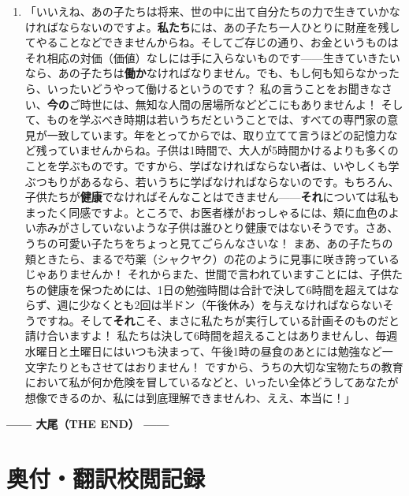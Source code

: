 \documentclass[a4paper,11pt,openany]{ltjsbook}
\begin{document}
\begin{enumerate}[label=\textbf{\arabic*.}, start=101]
\item 「いいえね、あの子たちは将来、世の中に出て自分たちの力で生きていかなければならないのですよ。\textbf{私たち}には、あの子たち一人ひとりに財産を残してやることなどできませんからね。そしてご存じの通り、お金というものはそれ相応の対価（価値）なしには手に入らないものです——生きていきたいなら、あの子たちは\textbf{働か}なければなりません。でも、もし何も知らなかったら、いったいどうやって働けるというのです？ 私の言うことをお聞きなさい、\textbf{今の}ご時世には、無知な人間の居場所などどこにもありませんよ！ そして、ものを学ぶべき時期は若いうちだということでは、すべての専門家の意見が一致しています。年をとってからでは、取り立てて言うほどの記憶力など残っていませんからね。子供は1時間で、大人が5時間かけるよりも多くのことを学ぶものです。ですから、学ばなければならない者は、いやしくも学ぶつもりがあるなら、若いうちに学ばなければならないのです。もちろん、子供たちが\textbf{健康}でなければそんなことはできません——\textbf{それ}については私もまったく同感ですよ。ところで、お医者様がおっしゃるには、頬に血色のよい赤みがさしていないような子供は誰ひとり健康ではないそうです。さあ、うちの可愛い子たちをちょっと見てごらんなさいな！ まあ、あの子たちの頬ときたら、まるで芍薬（シャクヤク）の花のように見事に咲き誇っているじゃありませんか！ それからまた、世間で言われていますことには、子供たちの健康を保つためには、1日の勉強時間は合計で決して6時間を超えてはならず、週に少なくとも2回は半ドン（午後休み）を与えなければならないそうですね。そして\textbf{それ}こそ、まさに私たちが実行している計画そのものだと請け合いますよ！ 私たちは決して6時間を超えることはありませんし、毎週水曜日と土曜日にはいつも決まって、午後1時の昼食のあとには勉強など一文字たりともさせてはおりません！ ですから、うちの大切な宝物たちの教育において私が何か危険を冒しているなどと、いったい全体どうしてあなたが想像できるのか、私には到底理解できませんわ、ええ、本当に！」
\end{enumerate}

\begin{center}
\vspace{6mm}
\textbf{—— 大尾（THE END） ——}
\end{center}

\backmatter
\chapter*{奥付・翻訳校閲記録}
\end{document}
